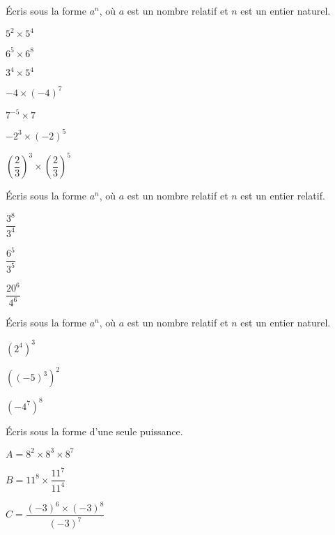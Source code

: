 \begin{exercice}[]
Écris sous la forme $a^n$, où $a$ est un nombre relatif et $n$ est un entier naturel.

\begin{colenumerate}{2} 
\item $5^2 \times 5^4$
\item $6^5\times 6^8$
\item $3^4 \times 5^4$
\item $-4\times (-4)^7$ 
\item $7^{-5}\times 7$
\item $-2^3\times (-2)^5$
\item $\left(\dfrac{2}{3}\right)^3 \times \left(\dfrac{2}{3}\right)^5$
\end{colenumerate} 
\end{exercice}

\begin{exercice}[]
Écris sous la forme $a^n$, où $a$ est un nombre relatif et $n$ est un entier relatif.
\begin{colenumerate}{3} 
\item $\dfrac{3^8}{3^4}$
\item $\dfrac{6^5}{3^5}$
\item $\dfrac{20^6}{4^6}$
\end{colenumerate} 
 
\end{exercice}

\begin{exercice}[]
Écris sous la forme $a^n$, où $a$ est un nombre relatif et $n$ est un entier naturel.

\begin{colenumerate}{3} 
\item $\left(2^4\right)^3$ 
\item $\left(\left(-5\right)^3\right)^2$
\item $\left(-4^7\right)^8$
\end{colenumerate} 
\end{exercice}

\begin{exercice}[]
Écris sous la forme d'une seule puissance.
\begin{colenumerate}{2} 
\item $A=8^2 \times 8^3 \times 8^7$
\item $B=11^8 \times \dfrac{11^7}{11^4}$
\item $C=\dfrac{\left(-3\right)^6 \times \left(-3\right)^8}{\left(-3\right)^7}$
\end{colenumerate} 
\end{exercice}

